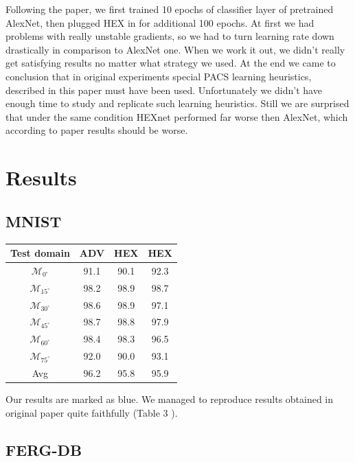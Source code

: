 \documentclass{article} %
\begin{document}
    Following the paper, we first trained 10 epochs of classifier layer of pretrained AlexNet, then plugged HEX in for
    additional 100 epochs. At first we had problems with really unstable gradients, so we had to turn learning rate down drastically in 
    comparison to AlexNet one. When we work it out, we didn't really get satisfying results no matter what strategy
    we used. At the end we came to conclusion that in original experiments special PACS learning heuristics, described in this paper \citep{Li2017dg} must have been used.
    Unfortunately we didn't have enough time to study and replicate such learning heuristics. Still we are surprised that
    under the same condition HEXnet performed far worse then AlexNet, which according to paper results should be worse.

\section{Results}
\subsection{MNIST}

\begin{table}[H]
    \centering
    \begin{tabular}{cccc}
        \hline
        Test domain & ADV & HEX & \color{blue} HEX \color{black} \\
        \hline
        $\mathcal{M}_{0^{\circ}}$    & 91.1 & 90.1 & 92.3 \\
        $\mathcal{M}_{{15}^{\circ}}$ & 98.2 & 98.9 & 98.7 \\
        $\mathcal{M}_{{30}^{\circ}}$ & 98.6 & 98.9 & 97.1 \\
        $\mathcal{M}_{{45}^{\circ}}$ & 98.7 & 98.8 & 97.9 \\
        $\mathcal{M}_{{60}^{\circ}}$ & 98.4 & 98.3 & 96.5 \\
        $\mathcal{M}_{{75}^{\circ}}$ & 92.0 & 90.0 & 93.1 \\
        \hline
        Avg & 96.2 & 95.8 & 95.9 \\
        \hline
    \end{tabular}
\end{table}

Our results are marked as blue. We managed to reproduce results obtained in original paper quite faithfully (Table 3  \citep{wang2018learning}).
\subsection{FERG-DB}
\end{document}
